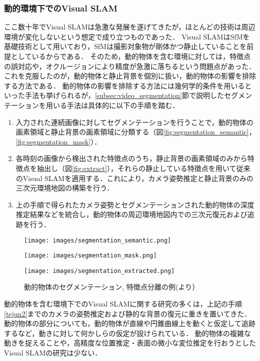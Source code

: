 \subsubsection{動的環境下でのVisual SLAM}\label{subsec:dynamic_visual_SLAM}
ここ数十年でVisual SLAMは急激な発展を遂げてきたが，ほとんどの技術は周辺環境が変化しないという想定で成り立つものであった．
Visual SLAMはSfMを基礎技術として用いており，SfMは撮影対象物が剛体かつ静止していることを前提としているからである．
そのため，動的物体を含む環境に対しては，特徴点の誤対応や，オクルージョンにより精度が急激に落ちるという問題点があった\cite{tan2013robust}．
これを克服したのが，動的物体と静止背景を個別に扱い，動的物体の影響を排除する方法である\cite{saputra2018visual}．
動的物体の影響を排除する方法には幾何学的条件を用いるといった手法も挙げられるが，\ref{subsec:video_segmentation}節で説明したセグメンテーションを用いる手法は具体的に以下の手順を踏む．
\begin{enumerate}
 \item 入力された連続画像に対してセグメンテーションを行うことで，動的物体の画素領域と静止背景の画素領域に分類する（図\ref{fig:segmentation_semantic}，\ref{fig:segmentation_mask}）．
 \item 各時刻の画像から検出された特徴点のうち，静止背景の画素領域のみから特徴点を抽出し（図\ref{fig:extract}），それらの静止している特徴点を用いて従来のVisual SLAMを適用する．これにより，カメラ姿勢推定と静止背景のみの三次元環境地図の構築を行う．
 \label{tejun2}
 \item 上の手順で得られたカメラ姿勢とセグメンテーションされた動的物体の深度推定結果などを統合し，動的物体の周辺環境地図内での三次元復元および追跡を行う．
\end{enumerate}

\begin{figure}[h]
\centering
	\begin{minipage}[t]{0.45\hsize}
		\centering
		\texttt{[image: images/segmentation\_semantic.png]}
		\label{fig:segmentation_semantic}
 	\end{minipage}
	\begin{minipage}[t]{0.45\hsize}
		\centering
		\texttt{[image: images/segmentation\_mask.png]}
		\label{fig:segmentation_mask}
	\end{minipage}
	\begin{minipage}[t]{0.45\hsize}
		\centering
		\texttt{[image: images/segmentation\_extracted.png]}
		\label{fig:extract}
		
	\end{minipage}
 \caption[動的物体のセグメンテーション,
 特徴点分離の例]{動的物体のセグメンテーション,
 	特徴点分離の例(\cite{liu2021rds}より）}
 \label{fig:segmentation}
\end{figure}

動的物体を含む環境下でのVisual SLAMに関する研究の多くは，上記の手順\ref{tejun2}までのカメラの姿勢推定および静的な背景の復元に重きを置いてきた．
動的物体の部分についても，動的物体が直線や円錐曲線上を動くと仮定して追跡する\cite{alcantarilla2012combining,avidan1999trajectory}など，動きに対して何かしらの仮定が設けられている．
動的物体の複雑な動きを捉えることや，高精度な位置推定・表面の微小な変位推定を行おうとしたVisual SLAMの研究は少ない．


